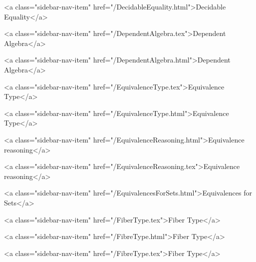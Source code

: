       
    
      
        
          <a class="sidebar-nav-item" href="/DecidableEquality.html">Decidable Equality</a>
        
      
    
      
        
          <a class="sidebar-nav-item" href="/DependentAlgebra.tex">Dependent Algebra</a>
        
      
    
      
        
          <a class="sidebar-nav-item" href="/DependentAlgebra.html">Dependent Algebra</a>
        
      
    
      
        
          <a class="sidebar-nav-item" href="/EquivalenceType.tex">Equivalence Type</a>
        
      
    
      
        
          <a class="sidebar-nav-item" href="/EquivalenceType.html">Equivalence Type</a>
        
      
    
      
        
          <a class="sidebar-nav-item" href="/EquivalenceReasoning.html">Equivalence reasoning</a>
        
      
    
      
        
          <a class="sidebar-nav-item" href="/EquivalenceReasoning.tex">Equivalence reasoning</a>
        
      
    
      
        
          <a class="sidebar-nav-item" href="/EquivalencesForSets.html">Equivalences for Sets</a>
        
      
    
      
        
          <a class="sidebar-nav-item" href="/FiberType.tex">Fiber Type</a>
        
      
    
      
        
          <a class="sidebar-nav-item" href="/FibreType.html">Fiber Type</a>
        
      
    
      
        
          <a class="sidebar-nav-item" href="/FibreType.tex">Fiber Type</a>
        
